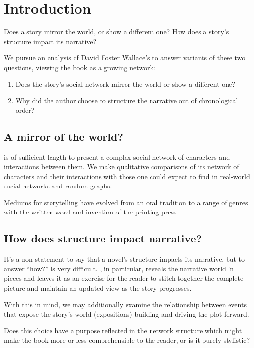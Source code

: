 \section{Introduction}

Does a story mirror the world, or show a different one? How does a story's structure impact its narrative?

We pursue an analysis of David Foster Wallace's \infinitejest to answer variants of these two questions, viewing the book as a growing network:

\begin{enumerate}
    \item Does the story's social network mirror the world or show a different one?
    \item Why did the author choose to structure the narrative out of chronological order?
\end{enumerate}

\subsection{A mirror of the world?}

\infinitejest is of sufficient length to present a complex social network of characters and interactions between them. We make qualitative comparisons of its network of characters and their interactions with those one could expect to find in real-world social networks and random graphs. 

Mediums for storytelling have evolved from an oral tradition to a range of genres with the written word and invention of the printing press. 

\subsection{How does structure impact narrative?}

It's a non-statement to say that a novel's structure impacts its narrative, but to answer ``how?'' is very difficult. \infinitejest, in particular, reveals the narrative world in pieces and leaves it as an exercise for the reader to stitch together the complete picture and maintain an updated view as the story progresses. 

With this in mind, we may additionally examine the relationship between events that expose the story's world (expositions) building and driving the plot forward. 



Does this choice have a purpose reflected in the network structure which might make the book more or less comprehensible to the reader, or is it purely stylistic?

